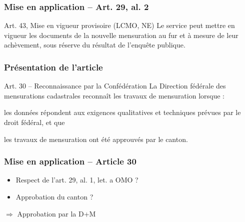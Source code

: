\documentclass{beamer}
\renewcommand{\up}[1]{\textsuperscript{#1}}
\begin{document}
\begin{frame}
    \frametitle{Mise en application -- Art. 29, al. 2}
    \begin{exampleblock}{Art. 43, Mise en vigueur provisoire (LCMO, NE)}
        Le  service  peut  mettre  en  vigueur  les  documents  de  la  nouvelle mensuration au fur et à mesure de leur achèvement, sous réserve du résultat de l'enquête publique.
    \end{exampleblock}


\end{frame}

\begin{frame}
    \frametitle{Présentation de l'article}
    \begin{alertblock}{Art. 30 -- Reconnaissance par la Confédération}
        La Direction fédérale des mensurations cadastrales \alert{reconnaît les travaux de mensuration} lorsque : \pause
        \begin{outline}
            \item les données répondent aux \alert{exigences qualitatives et techniques} prévues par le droit  fédéral, et que \pause
            \item les travaux de mensuration ont été \alert{approuvés par le canton}.
        \end{outline}
    \end{alertblock}
\end{frame}

\begin{frame}
    \frametitle{Mise en application -- Article 30}
    \begin{itemize}[label=]
        \item Respect de l'art. 29, al. 1, let. a OMO ? \pause
        \item Approbation du canton ? \pause
    \end{itemize}
    $\Longrightarrow$ Approbation par la D+M
\end{frame}
\end{document}
